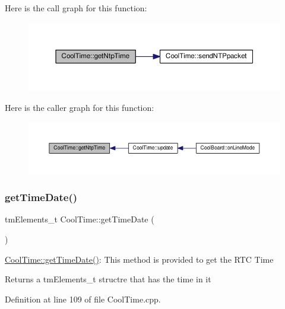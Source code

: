 Here is the call graph for this function\+:
\nopagebreak
\begin{figure}[H]
\begin{center}
\leavevmode
\includegraphics[width=350pt]{classCoolTime_a41fbbbfd651c2079f54d4b2911e4c705_cgraph}
\end{center}
\end{figure}
Here is the caller graph for this function\+:
\nopagebreak
\begin{figure}[H]
\begin{center}
\leavevmode
\includegraphics[width=350pt]{classCoolTime_a41fbbbfd651c2079f54d4b2911e4c705_icgraph}
\end{center}
\end{figure}
\mbox{\label{classCoolTime_a7a7501c5ca77dd1248bea704c44f986c}} 
\subsubsection{\texorpdfstring{get\+Time\+Date()}{getTimeDate()}}
{\footnotesize\ttfamily tm\+Elements\+\_\+t Cool\+Time\+::get\+Time\+Date (\begin{DoxyParamCaption}{ }\end{DoxyParamCaption})}

\hyperlink{classCoolTime_a7a7501c5ca77dd1248bea704c44f986c}{Cool\+Time\+::get\+Time\+Date()}\+: This method is provided to get the R\+TC Time

\begin{DoxyReturn}{Returns}
a tm\+Elements\+\_\+t structre that has the time in it 
\end{DoxyReturn}


Definition at line 109 of file Cool\+Time.\+cpp.



